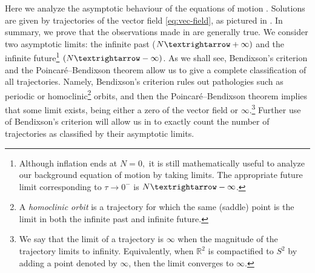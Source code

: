 Here we analyze the asymptotic behaviour of the equations of motion . Solutions are given by trajectories of the vector field \eqref{eq:vec-field}, as pictured in . In summary, we prove that the observations made in  are generally true. We consider two asymptotic limits: the infinite past ($N\textrightarrow+\infty)$ and the infinite future\footnote{Although inflation ends at $N=0,$ it is still mathematically useful to analyze our background equation of motion by taking limits. The appropriate future limit corresponding to $\tau\to0^{-}$ is $N\textrightarrow-\infty$. } $(N\textrightarrow-\infty)$. As we shall see, Bendixson's criterion and the Poincar\'e--Bendixson theorem \cite{bendixson1901} allow us to give a complete classification of all trajectories. Namely, Bendixson's criterion rules out pathologies such as periodic or homoclinic\footnote{A \emph{homoclinic orbit} is a trajectory for which the same (saddle) point is the limit in both the infinite past and infinite future.} orbits, and then the Poincar\'e--Bendixson theorem implies that some limit exists, being either a zero of the vector field or $\bm{\infty}$.\footnote{We say that the limit of a trajectory is $\bm{\infty}$ when the magnitude of the trajectory limits to infinity. Equivalently, when $\mathbb{R}^{2}$ is compactified to $S^{2}$ by adding a point denoted by $\bm{\infty}$, then the limit converges to $\bm{\infty}$. } Further use of Bendixson's criterion will allow us in  to exactly count the number of trajectories as classified by their asymptotic limits.

